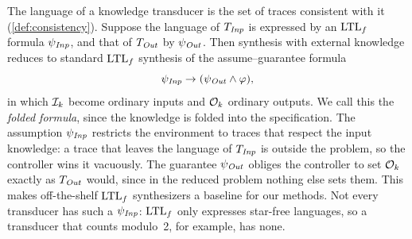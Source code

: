 The language of a knowledge transducer is the set of traces consistent with it (\cref{def:consistency}).
Suppose the language of $T_{\mathit{Inp}}$ is expressed by an $\text{LTL}_f$ formula $\psi_{\mathit{Inp}}$, and that of $T_{\mathit{Out}}$ by $\psi_{\mathit{Out}}$.
Then synthesis with external knowledge reduces to standard $\text{LTL}_f$ synthesis of the assume--guarantee formula
\[
  \psi_{\mathit{Inp}} \rightarrow (\psi_{\mathit{Out}} \wedge \varphi),
\]
in which $\mathcal{I}_{k}$ become ordinary inputs and $\mathcal{O}_{k}$ ordinary outputs.
We call this the \emph{folded formula}, since the knowledge is folded into the specification.
The assumption $\psi_{\mathit{Inp}}$ restricts the environment to traces that respect the input knowledge: a trace that leaves the language of $T_{\mathit{Inp}}$ is outside the problem, so the controller wins it vacuously.
The guarantee $\psi_{\mathit{Out}}$ obliges the controller to set $\mathcal{O}_{k}$ exactly as $T_{\mathit{Out}}$ would, since in the reduced problem nothing else sets them.
This makes off-the-shelf $\text{LTL}_f$ synthesizers a baseline for our methods.
Not every transducer has such a $\psi_{\mathit{Inp}}$: $\text{LTL}_f$ only expresses star-free languages, so a transducer that counts modulo~2, for example, has none.
